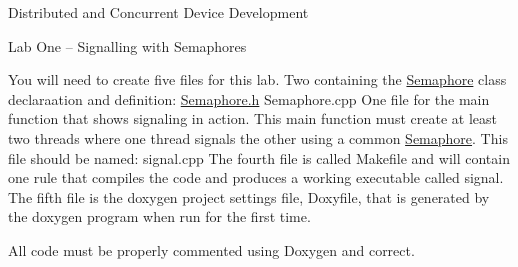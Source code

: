Distributed and Concurrent Device Development

Lab One – Signalling with Semaphores

You will need to create five files for this lab. Two containing the \hyperlink{classSemaphore}{Semaphore} class declaraation and definition\+: \hyperlink{Semaphore_8h_source}{Semaphore.\+h} Semaphore.\+cpp One file for the main function that shows signaling in action. This main function must create at least two threads where one thread signals the other using a common \hyperlink{classSemaphore}{Semaphore}. This file should be named\+: signal.\+cpp The fourth file is called Makefile and will contain one rule that compiles the code and produces a working executable called signal. The fifth file is the doxygen project settings file, Doxyfile, that is generated by the doxygen program when run for the first time.

All code must be properly commented using Doxygen and correct. 